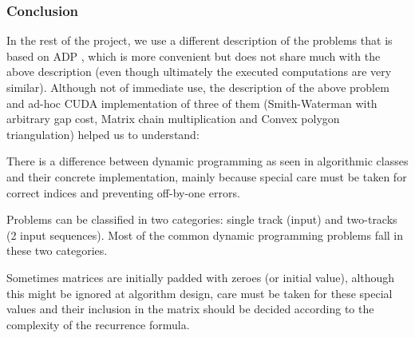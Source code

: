 \subsubsection{Conclusion}
In the rest of the project, we use a different description of the problems that is based on ADP \cite{adp}, which is more convenient but does not share much with the above description (even though ultimately the executed computations are very similar). Although not of immediate use, the description of the above problem and ad-hoc CUDA implementation of three of them (Smith-Waterman with arbitrary gap cost, Matrix chain multiplication and Convex polygon triangulation) helped us to understand:\ol
\item There is a difference between dynamic programming as seen in algorithmic classes and their concrete implementation, mainly because special care must be taken for correct indices and preventing off-by-one errors.
\item Problems can be classified in two categories: single track (input) and two-tracks (2 input sequences). Most of the common dynamic programming problems fall in these two categories.
\item Sometimes matrices are initially padded with zeroes (or initial value), although this might be ignored at algorithm design, care must be taken for these special values and their inclusion in the matrix should be decided according to the complexity of the recurrence formula.
\ole
